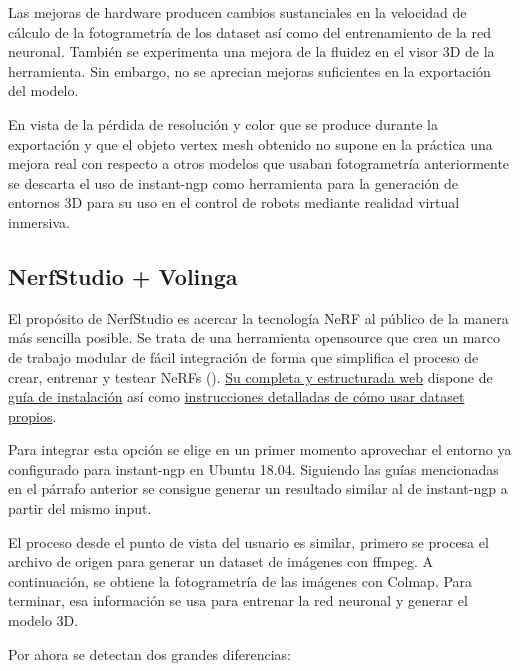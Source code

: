 \documentclass[a4paper, 12pt, spanish, twoside]{article}
\begin{document}
Las mejoras de hardware producen cambios sustanciales en la velocidad de cálculo de la fotogrametría de los dataset así como del entrenamiento de la red neuronal. También se experimenta una mejora de la fluidez en el visor 3D de la herramienta. Sin embargo, no se aprecian mejoras suficientes en la exportación del modelo.

En vista de la pérdida de resolución y color que se produce durante la exportación y que el objeto vertex mesh obtenido no supone en la práctica una mejora real con respecto a otros modelos que usaban fotogrametría anteriormente se descarta el uso de instant-ngp como herramienta para la generación de entornos 3D para su uso en el control de robots mediante realidad virtual inmersiva.


\subsection{NerfStudio + Volinga}

El propósito de NerfStudio es acercar la tecnología NeRF al público de la manera más sencilla posible. Se trata de una herramienta opensource que crea un marco de trabajo modular de fácil integración de forma que simplifica el proceso de crear, entrenar y testear NeRFs (\cite{nerfstudio}). \href{https://docs.nerf.studio/index.html}{Su completa y estructurada web} dispone de \href{https://docs.nerf.studio/quickstart/installation.html}{guía de instalación} así como \href{https://docs.nerf.studio/quickstart/custom_dataset.html}{instrucciones detalladas de cómo usar dataset propios}.   

Para integrar esta opción se elige en un primer momento aprovechar el entorno ya configurado para instant-ngp en Ubuntu 18.04. Siguiendo las guías mencionadas en el párrafo anterior se consigue generar un resultado similar al de instant-ngp a partir del mismo input.  

El proceso desde el punto de vista del usuario es similar, primero se procesa el archivo de origen para generar un dataset de imágenes con ffmpeg. A continuación, se obtiene la fotogrametría de las imágenes con Colmap. Para terminar, esa información se usa para entrenar la red neuronal y generar el modelo 3D. 


 Por ahora se detectan dos grandes diferencias: 
\end{document}
